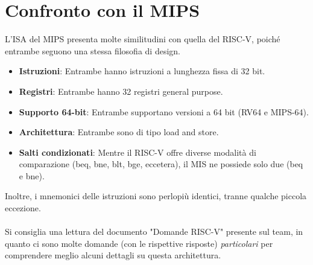 \section{Confronto con il MIPS}
L'ISA del MIPS presenta molte similitudini con quella del RISC-V, poiché entrambe seguono una stessa filosofia di design.
\begin{itemize}
	\item \textbf{Istruzioni}: Entrambe hanno istruzioni a lunghezza fissa di 32 bit.
	\item \textbf{Registri}: Entrambe hanno 32 registri general purpose.
	\item \textbf{Supporto 64-bit}: Entrambe supportano versioni a 64 bit (RV64 e MIPS-64).
	\item \textbf{Architettura}: Entrambe sono di tipo load and store.
	\item \textbf{Salti condizionati}: Mentre il RISC-V offre diverse modalità di comparazione (beq, bne, blt, bge, eccetera), il MIS ne possiede solo due (beq e bne).
\end{itemize}
Inoltre, i mnemonici delle istruzioni sono perlopiù identici, tranne qualche piccola eccezione.
\\
\\
Si consiglia una lettura del documento "Domande RISC-V" presente sul team, in quanto ci sono molte domande (con le rispettive risposte) \textit{particolari} per comprendere meglio alcuni dettagli su questa architettura.